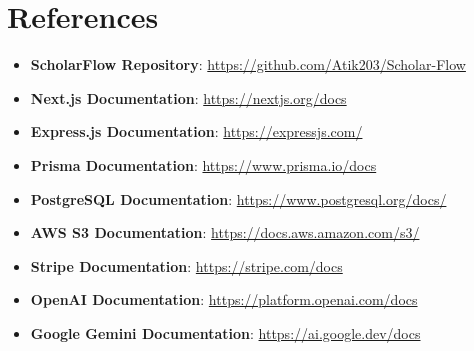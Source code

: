 \chapter{References}
\label{ch:srs-references}

\begin{itemize}[leftmargin=*,topsep=5pt,itemsep=3pt]
    \item \textbf{ScholarFlow Repository}: \url{https://github.com/Atik203/Scholar-Flow}
    \item \textbf{Next.js Documentation}: \url{https://nextjs.org/docs}
    \item \textbf{Express.js Documentation}: \url{https://expressjs.com/}
    \item \textbf{Prisma Documentation}: \url{https://www.prisma.io/docs}
    \item \textbf{PostgreSQL Documentation}: \url{https://www.postgresql.org/docs/}
    \item \textbf{AWS S3 Documentation}: \url{https://docs.aws.amazon.com/s3/}
    \item \textbf{Stripe Documentation}: \url{https://stripe.com/docs}
    \item \textbf{OpenAI Documentation}: \url{https://platform.openai.com/docs}
    \item \textbf{Google Gemini Documentation}: \url{https://ai.google.dev/docs}
\end{itemize}
